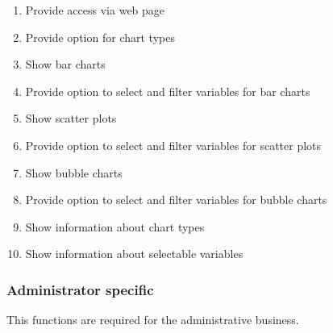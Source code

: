 \begin{enumerate}[label={{/F}\itemnumber*{/}}, series=func]
  \item Provide access via web page \label{f1}
    
  \item Provide option for \gls{chart} types \label{f2}
  

  \item Show \glspl{bar chart} \label{f4} %
    
  
  \item Provide option to select and filter variables for \glspl{bar chart}  \label{f6}
  
  
  \item Show \glspl{scatter plot} \label{f7} %
  
  
  \item Provide option to select and filter variables for \glspl{scatter plot} \label{f9} 
  
  \item Show \glspl{bubble chart} \label{f10} %
  
 \item Provide option to select and filter variables for \glspl{bubble chart} \label{f11}
  
  
  \item Show information about \gls{chart} types \label{f13}
  
  \item Show information about selectable variables\label{f14}
  
  
\end{enumerate}


\subsubsection*{Administrator specific}
This functions are required for the administrative business.


